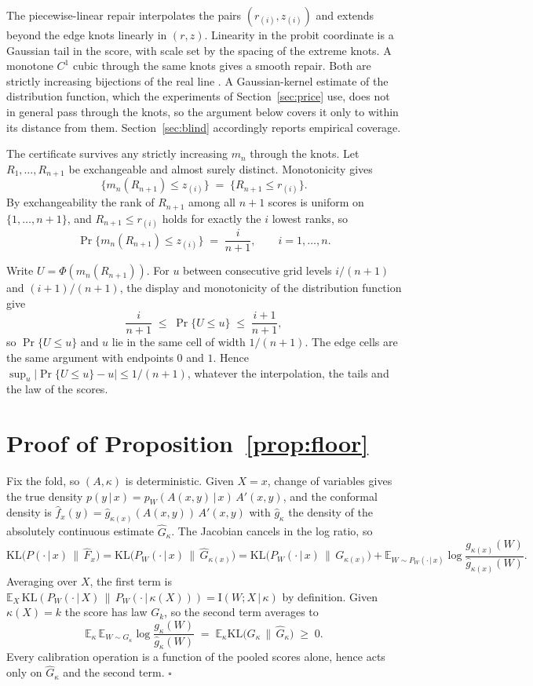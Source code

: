 \documentclass[11pt]{article}
\theoremstyle{remark}
\newcommand{\E}{\mathbb{E}}
\newcommand{\I}{\mathrm{I}}
\newcommand{\given}{\,|\,}
\newcommand{\KLop}{\mathrm{KL}}
\begin{document}
The piecewise-linear repair interpolates the pairs $(r_{(i)},z_{(i)})$ and extends
beyond the edge knots linearly in $(r,z)$. Linearity in the probit coordinate is a
Gaussian tail in the score, with scale set by the spacing of the extreme knots. A monotone
$C^1$ cubic through the same knots gives a smooth repair. Both are strictly increasing
bijections of the real line \citep{cotton2026grammar}. A Gaussian-kernel estimate of
the distribution function, which the experiments of Section~\ref{sec:price} use, does
not in general pass through the knots, so the argument below covers it only to within
its distance from them. Section~\ref{sec:blind} accordingly reports empirical coverage.

The certificate survives any strictly increasing $m_n$ through the knots. Let
$R_1,\dots,R_{n+1}$ be exchangeable and almost surely distinct. Monotonicity gives
\[
\{m_n(R_{n+1})\le z_{(i)}\}\;=\;\{R_{n+1}\le r_{(i)}\}.
\]
By exchangeability the rank of $R_{n+1}$ among all $n+1$ scores is uniform on
$\{1,\dots,n+1\}$, and $R_{n+1}\le r_{(i)}$ holds for exactly the $i$ lowest ranks,
so
\[
\Pr\{m_n(R_{n+1})\le z_{(i)}\}\;=\;\frac{i}{n+1},\qquad i=1,\dots,n .
\]

Write $U=\Phi(m_n(R_{n+1}))$. For $u$ between consecutive grid levels $i/(n+1)$ and
$(i+1)/(n+1)$, the display and monotonicity of the distribution function give
\[
\frac{i}{n+1}\;\le\;\Pr\{U\le u\}\;\le\;\frac{i+1}{n+1},
\]
so $\Pr\{U\le u\}$ and $u$ lie in the same cell of width $1/(n+1)$. The edge cells
are the same argument with endpoints $0$ and $1$. Hence
$\sup_u|\Pr\{U\le u\}-u|\le 1/(n+1)$, whatever the interpolation, the tails and the
law of the scores.

\section{Proof of Proposition~\ref{prop:floor}}\label{app:floor}

Fix the fold, so $(A,\kappa)$ is deterministic. Given $X=x$, change of
variables gives the true density $p(y\given x) = p_W(A(x,y)\given x)\,A'(x,y)$,
and the conformal density is $\widehat f_x(y) = \widehat
g_{\kappa(x)}(A(x,y))\,A'(x,y)$ with $\widehat g_\kappa$ the density of the
absolutely continuous estimate $\widehat G_\kappa$. The Jacobian cancels in the
log ratio, so
\[
\KLop\big(P(\cdot\given x)\,\|\,\widehat F_x\big)
= \KLop\big(P_W(\cdot\given x)\,\|\,\widehat G_{\kappa(x)}\big)
= \KLop\big(P_W(\cdot\given x)\,\|\,G_{\kappa(x)}\big)
+ \E_{W\sim P_W(\cdot\given x)}\log\frac{g_{\kappa(x)}(W)}{\widehat g_{\kappa(x)}(W)} .
\]
Averaging over $X$, the first term is
$\E_X\,\KLop(P_W(\cdot\given X)\,\|\,P_W(\cdot\given\kappa(X))) =
\I(W;X\given\kappa)$ by definition. Given $\kappa(X)=k$ the score has law $G_k$,
so the second term averages to
\[
\E_\kappa\,\E_{W\sim G_\kappa}\log\frac{g_\kappa(W)}{\widehat g_\kappa(W)}
\;=\;\E_\kappa \KLop\!\big(G_\kappa\,\|\,\widehat G_\kappa\big)\;\ge\;0 .
\]
Every calibration
operation is a function of the pooled scores alone, hence acts only on
$\widehat G_\kappa$ and the second term. \hfill$\square$
\end{document}
